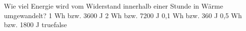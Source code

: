     {Wie viel Energie wird vom Widerstand innerhalb einer Stunde in Wärme umgewandelt?}
    {1 Wh bzw. 3600 J}
    {2 Wh bzw. 7200 J}
    {0,1 Wh bzw. 360 J}
    {0,5 Wh bzw. 1800 J}
    {true}{false}